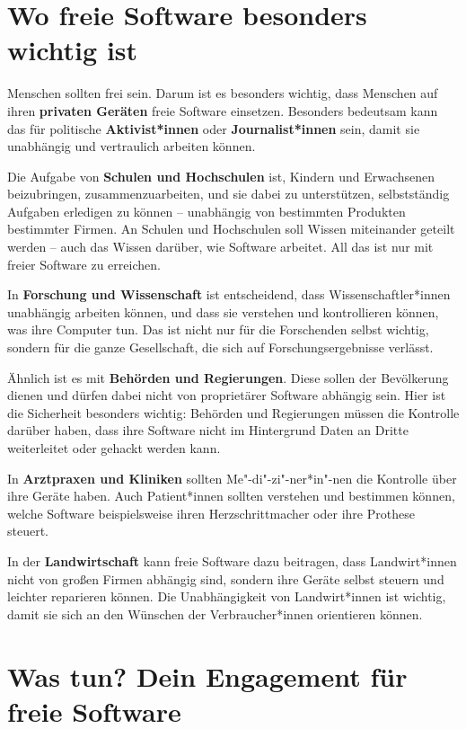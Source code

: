 \documentclass[a5paper,12pt]{scrartcl}
\begin{document}
\section{Wo freie Software besonders wichtig ist}

Menschen sollten frei sein. Darum ist es besonders wichtig, dass
Menschen auf ihren \textbf{privaten Geräten} freie Software
einsetzen. Besonders bedeutsam kann das für politische
\textbf{Aktivist*innen} oder \textbf{Journalist*innen} sein, damit sie
unabhängig und vertraulich arbeiten können.

Die Aufgabe von \textbf{Schulen und Hochschulen} ist, Kindern und
Erwachsenen beizubringen, zusammenzuarbeiten, und sie dabei zu
unterstützen, selbstständig Aufgaben erledigen zu können -- unabhängig
von bestimmten Produkten bestimmter Firmen. An Schulen und Hochschulen
soll Wissen miteinander geteilt werden -- auch das Wissen darüber, wie
Software arbeitet. All das ist nur mit freier Software zu erreichen.

In \textbf{Forschung und Wissenschaft} ist entscheidend, dass
Wissenschaftler*innen unabhängig arbeiten können, und dass sie
verstehen und kontrollieren können, was ihre Computer tun. Das ist
nicht nur für die Forschenden selbst wichtig, sondern für die ganze
Gesellschaft, die sich auf Forschungsergebnisse verlässt.

Ähnlich ist es mit \textbf{Behörden und Regierungen}. Diese sollen der
Bevölkerung dienen und dürfen dabei nicht von proprietärer Software
abhängig sein. Hier ist die Sicherheit besonders wichtig: Behörden und
Regierungen müssen die Kontrolle darüber haben, dass ihre Software
nicht im Hintergrund Daten an Dritte weiterleitet oder gehackt werden
kann.

In \textbf{Arztpraxen und Kliniken} sollten Me"-di"-zi"-ner*in"-nen
die Kontrolle über ihre Geräte haben. Auch Patient*innen sollten
verstehen und bestimmen können, welche Software beispielsweise ihren
Herzschrittmacher oder ihre Prothese steuert.

In der \textbf{Landwirtschaft} kann freie Software dazu beitragen,
dass Landwirt*innen nicht von großen Firmen abhängig sind, sondern
ihre Geräte selbst steuern und leichter reparieren können. Die
Unabhängigkeit von Landwirt*innen ist wichtig, damit sie sich an den
Wünschen der Verbraucher*innen orientieren können.


\section{Was tun? Dein Engagement für freie Software}
\end{document}
